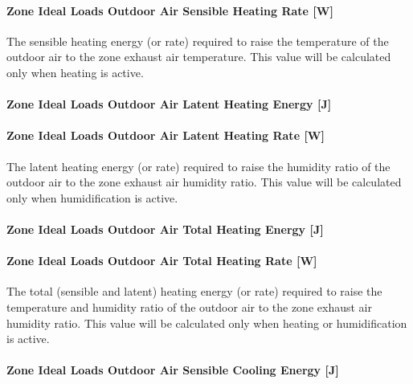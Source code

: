 \paragraph{Zone Ideal Loads Outdoor Air Sensible Heating Rate {[}W{]}}\label{zone-ideal-loads-outdoor-air-sensible-heating-rate-w}

The sensible heating energy (or rate) required to raise the temperature of the outdoor air to the zone exhaust air temperature. This value will be calculated only when heating is active.

\paragraph{Zone Ideal Loads Outdoor Air Latent Heating Energy {[}J{]}}\label{zone-ideal-loads-outdoor-air-latent-heating-energy-j}

\paragraph{Zone Ideal Loads Outdoor Air Latent Heating Rate {[}W{]}}\label{zone-ideal-loads-outdoor-air-latent-heating-rate-w}

The latent heating energy (or rate) required to raise the humidity ratio of the outdoor air to the zone exhaust air humidity ratio. This value will be calculated only when humidification is active.

\paragraph{Zone Ideal Loads Outdoor Air Total Heating Energy {[}J{]}}\label{zone-ideal-loads-outdoor-air-total-heating-energy-j}

\paragraph{Zone Ideal Loads Outdoor Air Total Heating Rate {[}W{]}}\label{zone-ideal-loads-outdoor-air-total-heating-rate-w}

The total (sensible and latent) heating energy (or rate) required to raise the temperature and humidity ratio of the outdoor air to the zone exhaust air humidity ratio. This value will be calculated only when heating or humidification is active.

\paragraph{Zone Ideal Loads Outdoor Air Sensible Cooling Energy {[}J{]}}\label{zone-ideal-loads-outdoor-air-sensible-cooling-energy-j}

